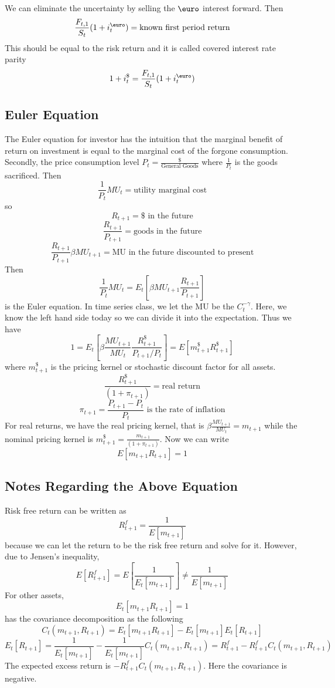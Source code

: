 \documentclass[11pt, a4paper, oneside]{article}
\theoremstyle{definition}
\theoremstyle{proposition}
\theoremstyle{corollary}
\theoremstyle{lemma}
\theoremstyle{theorem}
\begin{document}
We can eliminate the uncertainty by selling the $\text{\euro}$ interest forward. Then
$$\frac{F_{t, 1}}{S_t} (1+i_t^{\text{\euro}})= \text{known first period return}$$ 
This should be equal to the risk return and it is called covered interest rate parity 
$$1+i_t^{\$} = \frac{F_{t, 1}}{S_t} (1+i_t^{\text{\euro}})$$

\subsection{Euler Equation}
The Euler equation for investor has the intuition that the marginal benefit of return on investment is equal to the marginal cost of the forgone consumption. Secondly, the price consumption level $P_t = \frac{\$}{\text{General Goods}}$ where $\frac{1}{P_t}$ is the goods sacrificed. Then
$$\frac{1}{P_t} MU_t = \text{utility marginal cost}$$ so 
$$R_{t+1} = \$\text{ in the future}$$
$$\frac{R_{t+1}}{P_{t+1}} = \text{goods in the future}$$ 
$$\frac{R_{t+1}}{P_{t+1}}\beta MU_{t+1}= \text{MU in the future discounted to present}$$ 
Then
$$\frac{1}{P_t} MU_t = E_t\left[\beta MU_{t+1}\frac{R_{t+1}}{P_{t+1}}\right]$$ is the Euler equation. In time series class, we let the MU be the $C_t^{-\gamma}$.  Here, we know the left hand side today so we can divide it into the expectation. Thus we have
$$1 = E_t\left[\beta\frac{MU_{t+1}}{MU_t}\frac{R^{\$}_{t+1}}{P_{t+1}/P_t}\right] = E[m_{t+1}^{\$}R^{\$}_{t+1}]$$ where $m_{t+1}^{\$}$ is the pricing kernel or stochastic discount factor for all assets. 
$$\frac{R^{\$}_{t+1}}{(1+\pi_{t+1})} = \text{real return}$$
$$\pi_{t+1} = \frac{P_{t+1} - P_{t}}{P_{t}}\text{ is the rate of inflation}$$ 
For real returns, we have the real pricing kernel, that is $\beta\frac{MU_{t+1}}{MU_t} = m_{t+1}$ while the nominal pricing kernel is $m_{t+1}^{\$} = \frac{m_{t+1}}{(1+\pi_{t+1})}$. Now we can write 
$$E[m_{t+1}R_{t+1}] = 1$$

\subsection{Notes Regarding the Above Equation}
Risk free return can be written as $$R_{t+1}^f = \frac{1}{E[m_{t+1}]}$$ because we can let the return to be the risk free return and solve for it. 
However, due to Jensen's inequality, $$E[R_{t+1}^f] = E\left[\frac{1}{E_t[m_{t+1}]}\right] \neq \frac{1}{E[m_{t+1}]}$$
For other assets, 
$$E_t[m_{t+1}R_{t +1}] = 1$$ has the covariance decomposition as the following
$$C_t(m_{t+1}, R_{t+1}) = E_t[m_{t+1}R_{t+1}]  - E_t[m_{t+1}]E_t[R_{t+1}]$$
$$E_t[R_{t+1}] = \frac{1}{E_t[m_{t+1}]} - \frac{1}{E_t[m_{t+1}]} C_t(m_{t+1}, R_{t+1}) = R_{t+1}^f - R_{t+1}^fC_t(m_{t+1}, R_{t+1}) $$
The expected excess return is $-R^f_{t+1}C_t(m_{t+1}, R_{t+1})$. Here the covariance is negative. 
\end{document}
